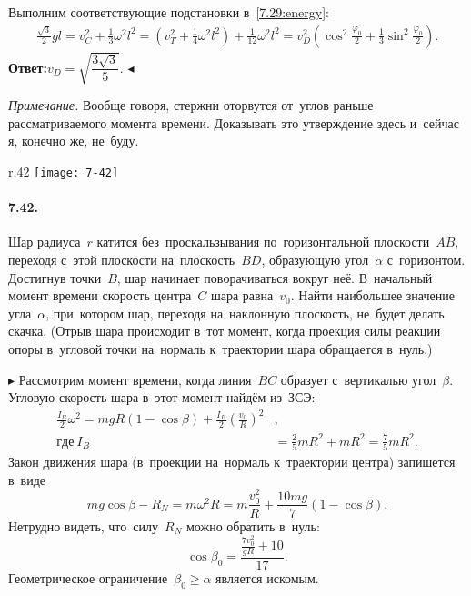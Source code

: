 \documentclass{weekly}
\begin{document}
Выполним соответствующие подстановки в~\eqref{7.29:energy}:
\begin{gather}
    \frac{\sqrt{3}}{2} gl = v_C^2 + \frac{1}{3} \omega^2 l^2
        = \left(v_T^2 + \frac{1}{4} \omega^2 l^2\right)
            + \frac{1}{12} \omega^2 l^2
        = v_D^2 \left(\cos^2\frac{\varphi_0}{2}
            + \frac{1}{3} \sin^2\frac{\varphi_0}{2}\right).
\end{gather}
\textbf{Ответ:}\qquad $v_D = \sqrt{\dfrac{3\sqrt{3}}{5}}$.
\hfill $\blacktriangleleft$

\bigskip
\begin{small}
\textsl{Примечание.} Вообще говоря, стержни оторвутся от~углов
раньше рассматриваемого момента времени.
Доказывать это утверждение здесь и~сейчас я, конечно же, не~буду.
\end{small}


\begin{wrapfigure}[6]{r}{.42\textwidth}
\texttt{[image: 7-42]}
\end{wrapfigure}
\paragraph{7.42.} Шар радиуса~$r$ катится без~проскальзывания
по~горизонтальной плоскости~$AB$, переходя с~этой плоскости
на~плоскость~$BD$, образующую угол~$\alpha$ с~горизонтом.
Достигнув точки~$B$, шар начинает поворачиваться вокруг неё.
В~начальный момент времени скорость центра~$C$ шара равна~$v_0$.
Найти наибольшее значение угла~$\alpha$, при~котором шар,
переходя на~наклонную плоскость, не~будет делать скачка.
(Отрыв шара происходит в~тот момент, когда проекция силы реакции
опоры в~угловой точки на~нормаль к~траектории шара обращается в~нуль.)

$\blacktriangleright$ Рассмотрим момент времени, когда
линия~$BC$ образует с~вертикалью угол~$\beta$.
Угловую скорость шара в~этот момент найдём из~ЗСЭ:
\begin{align}
    \frac{I_B}{2} \omega^2 = mgR(1-\cos\beta) +
            \frac{I_B}{2} \left(\frac{v_0}{R}\right)^2&, \\
    где~I_B &= \frac{2}{5}mR^2 + mR^2 = \frac{7}{5}mR^2.
\end{align}
Закон движения шара (в~проекции на~нормаль к~траектории центра)
запишется в~виде
\begin{equation}
    mg\cos\beta - R_N = m\omega^2 R
        = m\frac{v_0^2}{R} + \frac{10mg}{7} (1-\cos\beta).
\end{equation}
Нетрудно видеть, что~силу~$R_N$ можно обратить в~нуль:
\begin{equation}
    \cos\beta_0 = \frac{\frac{7v_0^2}{gR} + 10}{17}.
\end{equation}
Геометрическое ограничение~$\beta_0 \geqslant \alpha$
является искомым.
\end{document}
